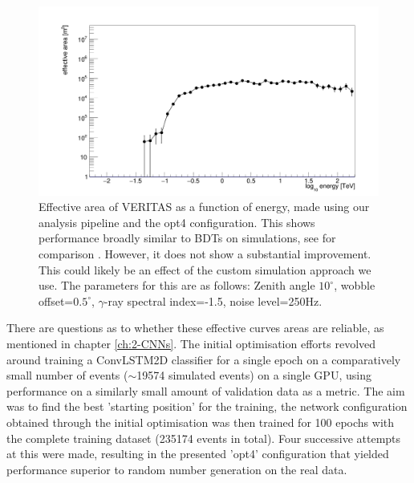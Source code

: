 \begin{figure}[] 
        \centering \includegraphics[width=\columnwidth]{figures/EFF.png}

        \caption{
                \label{fig:EFF} Effective area of VERITAS as a function of energy, made using our analysis pipeline and the opt4 configuration. This shows performance broadly similar to BDTs on simulations, see for comparison \cite{vereff}. However, it does not show a substantial improvement. This could likely be an effect of the custom simulation approach we use. The parameters for this are as follows: Zenith angle $10^{\circ}$, wobble offset=$0.5^{\circ}$, $\gamma$-ray spectral index=-1.5, noise level=250Hz. 
        }
\end{figure}
There are questions as to whether these effective curves areas are reliable, as mentioned in chapter \ref{ch:2-CNNs}. 
The initial optimisation efforts revolved around training a ConvLSTM2D classifier for a single epoch on a comparatively small number of events ($\sim$19574 simulated events) on a single GPU, using performance on a similarly small amount of validation data as a metric. The aim was to find the best 'starting position' for the training, the network configuration obtained through the initial optimisation was then trained for 100 epochs with the complete training dataset (235174 events in total). Four successive attempts at this were made, resulting in the presented 'opt4' configuration that yielded performance superior to random number generation on the real data. 


\begin{table}[h]
    \centering
    \caption{Anasum output for custom simulations alone run.}
    \label{table:RNG}
\end{table}

